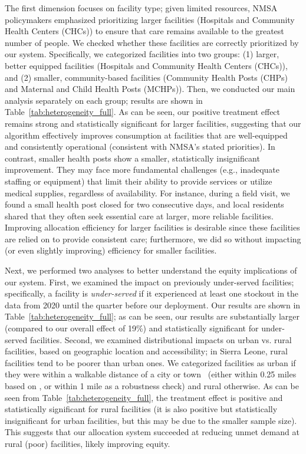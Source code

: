 \documentclass[12pt]{article}
\begin{document}
The first dimension focuses on facility type; given limited resources, NMSA policymakers emphasized prioritizing larger facilities (Hospitals and Community Health Centers (CHCs)) to ensure that care remains available to the greatest number of people. We checked whether these facilities are correctly prioritized by our system. Specifically, we categorized facilities into two groups: (1) larger, better equipped facilities (Hospitals and Community Health Centers (CHCs)), and (2) smaller, community-based facilities (Community Health Posts (CHPs) and Maternal and Child Health Posts (MCHPs)). Then, we conducted our main analysis separately on each group; results are shown in Table~\ref{tab:heterogeneity_full}. As can be seen, our positive treatment effect remains strong and statistically significant for larger facilities, suggesting that our algorithm effectively improves consumption at facilities that are well-equipped and consistently operational (consistent with NMSA's stated priorities). In contrast, smaller health posts show a smaller, statistically insignificant improvement. They may face more fundamental challenges (e.g., inadequate staffing or equipment) that limit their ability to provide services or utilize medical supplies, regardless of availability. For instance, during a field visit, we found a small health post closed for two consecutive days, and local residents shared that they often seek essential care at larger, more reliable facilities. Improving allocation efficiency for larger facilities is desirable since these facilities are relied on to provide consistent care; furthermore, we did so without impacting (or even slightly improving) efficiency for smaller facilities.

Next, we performed two analyses to better understand the equity implications of our system. First, we examined the impact on previously under-served facilities; specifically, a facility is \emph{under-served} if it experienced at least one stockout in the data from 2020 until the quarter before our deployment. Our results are shown in Table~\ref{tab:heterogeneity_full}; as can be seen, our results are substantially larger (compared to our overall effect of 19\%) and statistically significant for under-served facilities. Second, we examined distributional impacts on urban vs. rural facilities, based on geographic location and accessibility; in Sierra Leone, rural facilities tend to be poorer than urban ones. We categorized facilities as urban if they were within a walkable distance of a city or town~\cite{simplemaps_worldcities_2025} (either within 0.25 miles based on \cite{yang2012walking}, or within 1 mile as a robustness check) and rural otherwise. As can be seen from Table~\ref{tab:heterogeneity_full}, the treatment effect is positive and statistically significant for rural facilities (it is also positive but statistically insignificant for urban facilities, but this may be due to the smaller sample size). This suggests that our allocation system succeeded at reducing unmet demand at rural (poor) facilities, likely improving equity.
\end{document}

